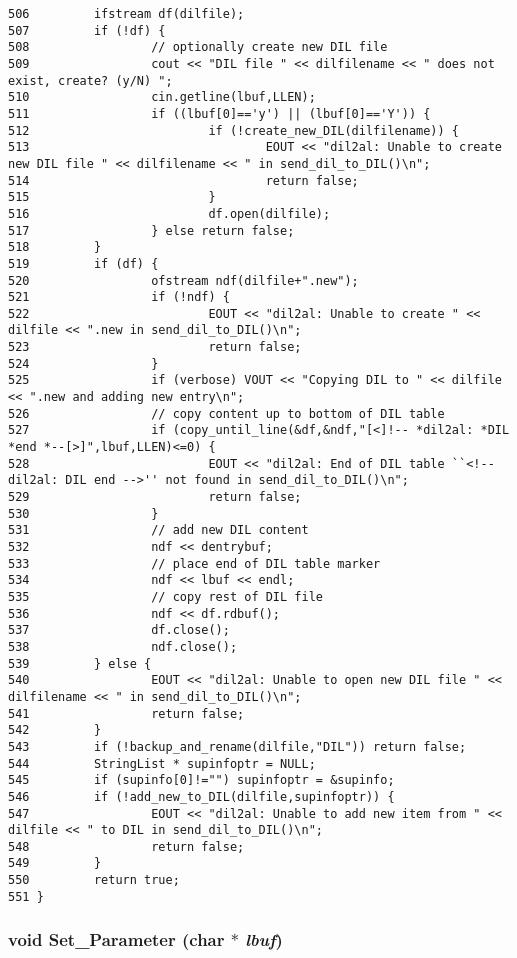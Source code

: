 \begin{verbatim}
506         ifstream df(dilfile);
507         if (!df) {
508                 // optionally create new DIL file
509                 cout << "DIL file " << dilfilename << " does not exist, create? (y/N) ";
510                 cin.getline(lbuf,LLEN);
511                 if ((lbuf[0]=='y') || (lbuf[0]=='Y')) {
512                         if (!create_new_DIL(dilfilename)) {
513                                 EOUT << "dil2al: Unable to create new DIL file " << dilfilename << " in send_dil_to_DIL()\n";
514                                 return false;
515                         }
516                         df.open(dilfile);
517                 } else return false;
518         }
519         if (df) {
520                 ofstream ndf(dilfile+".new");
521                 if (!ndf) {
522                         EOUT << "dil2al: Unable to create " << dilfile << ".new in send_dil_to_DIL()\n";
523                         return false;
524                 }
525                 if (verbose) VOUT << "Copying DIL to " << dilfile << ".new and adding new entry\n";
526                 // copy content up to bottom of DIL table
527                 if (copy_until_line(&df,&ndf,"[<]!-- *dil2al: *DIL *end *--[>]",lbuf,LLEN)<=0) {
528                         EOUT << "dil2al: End of DIL table ``<!-- dil2al: DIL end -->'' not found in send_dil_to_DIL()\n";
529                         return false;
530                 }
531                 // add new DIL content
532                 ndf << dentrybuf;
533                 // place end of DIL table marker
534                 ndf << lbuf << endl;
535                 // copy rest of DIL file
536                 ndf << df.rdbuf();
537                 df.close();
538                 ndf.close();
539         } else {
540                 EOUT << "dil2al: Unable to open new DIL file " << dilfilename << " in send_dil_to_DIL()\n";
541                 return false;
542         }
543         if (!backup_and_rename(dilfile,"DIL")) return false;
544         StringList * supinfoptr = NULL;
545         if (supinfo[0]!="") supinfoptr = &supinfo;
546         if (!add_new_to_DIL(dilfile,supinfoptr)) {
547                 EOUT << "dil2al: Unable to add new item from " << dilfile << " to DIL in send_dil_to_DIL()\n";
548                 return false;
549         }
550         return true;
551 }
\end{verbatim}\normalsize 
{}
\subsubsection{\setlength{\rightskip}{0pt plus 5cm}void Set\_\-Parameter (char $\ast$ {\em lbuf})}\label{dil2al_8hh_a209}




